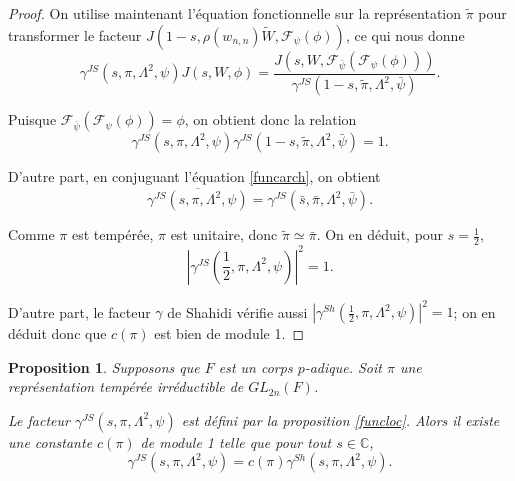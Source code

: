 \documentclass{amsart}
\newtheorem{proposition}{Proposition}[section]
\begin{document}
\begin{proof}
 On utilise maintenant l'équation fonctionnelle sur la représentation $\tilde{\pi}$ pour transformer le facteur $J(1-s, \rho(w_{n,n})\tilde{W}, \mathcal{F}_\psi(\phi))$, ce qui nous donne
 \begin{equation}
 \gamma^{JS}(s, \pi, \Lambda^2, \psi) J(s, W, \phi) = \frac{J(s, W, \mathcal{F}_{\bar{\psi}}(\mathcal{F}_\psi(\phi)))}{\gamma^{JS}(1-s, \tilde{\pi}, \Lambda^2, \bar{\psi})}.
 \end{equation}
 
 Puisque $\mathcal{F}_{\bar{\psi}}(\mathcal{F}_\psi(\phi)) = \phi$, on obtient donc la relation 
 \begin{equation}
 \gamma^{JS}(s, \pi, \Lambda^2, \psi)\gamma^{JS}(1-s, \tilde{\pi}, \Lambda^2, \bar{\psi}) = 1.
 \end{equation}
 
 D'autre part, en conjuguant l'équation \ref{funcarch}, on obtient
 \begin{equation}
 \overline{\gamma^{JS}(s, \pi, \Lambda^2, \psi)} = \gamma^{JS}(\bar{s}, \bar{\pi}, \Lambda^2, \bar{\psi}).
 \end{equation}
 
 Comme $\pi$ est tempérée, $\pi$ est unitaire, donc $\tilde{\pi} \simeq \bar{\pi}$. On en déduit, pour $s = \frac{1}{2}$,
 \begin{equation}
 |\gamma^{JS}(\frac{1}{2}, \pi, \Lambda^2, \psi)|^2=1.
 \end{equation}
 
 D'autre part, le facteur $\gamma$ de Shahidi vérifie aussi $|\gamma^{Sh}(\frac{1}{2}, \pi, \Lambda^2, \psi)|^2=1$; on en déduit donc que $c(\pi)$ est bien de module 1.
 \end{proof}
 
 \begin{proposition}
 Supposons que $F$ est un corps $p$-adique. Soit $\pi$ une représentation tempérée irréductible de $GL_{2n}(F)$. 
 
 Le facteur $\gamma^{JS}(s,\pi,\Lambda^2,\psi)$ est défini par la proposition \ref{funcloc}. Alors il existe une constante $c(\pi)$ de module 1 telle que pour tout $s \in \mathbb{C}$,
 \begin{equation}
 \gamma^{JS}(s, \pi, \Lambda^2, \psi) = c(\pi)\gamma^{Sh}(s, \pi, \Lambda^2, \psi).
 \end{equation}
 \end{proposition}
 
\end{document}
